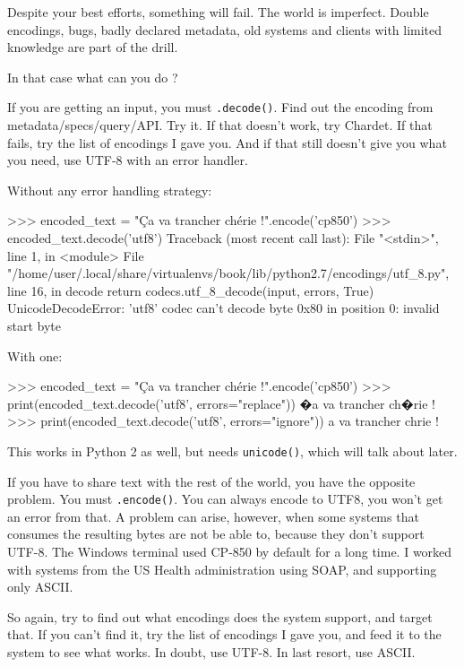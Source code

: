 Despite your best efforts, something will fail. The world is imperfect. Double encodings, bugs, badly declared metadata, old systems and clients with limited knowledge are part of the drill.

In that case what can you do ?

If you are getting an input, you must \lstinline{.decode()}. Find out the encoding from metadata/specs/query/API. Try it. If that doesn't work, try Chardet. If that fails, try the list of encodings I gave you. And if that still doesn't give you what you need, use UTF-8 with an error handler.

Without any error handling strategy:

\begin{py3}
>>> encoded_text = "Ça va trancher chérie !".encode('cp850')
>>> encoded_text.decode('utf8')
Traceback (most recent call last):
  File "<stdin>", line 1, in <module>
  File "/home/user/.local/share/virtualenvs/book/lib/python2.7/encodings/utf_8.py", line 16, in decode
    return codecs.utf_8_decode(input, errors, True)
UnicodeDecodeError: 'utf8' codec can't decode byte 0x80 in position 0: invalid start byte
\end{py3}

With one:

\begin{py3}
>>> encoded_text = "Ça va trancher chérie !".encode('cp850')
>>> print(encoded_text.decode('utf8', errors="replace"))
�a va trancher ch�rie !
>>> print(encoded_text.decode('utf8', errors="ignore"))
a va trancher chrie !
\end{py3}

This works in Python 2 as well, but needs \lstinline{unicode()}, which will talk about later.

If you have to share text with the rest of the world, you have the opposite problem. You must \lstinline{.encode()}. You can always encode to UTF8, you won't get an error from that. A problem can arise, however, when some systems that consumes the resulting bytes are not be able to, because they don't support UTF-8. The Windows terminal used CP-850 by default for a long time. I worked with systems from the US Health administration using SOAP, and supporting only ASCII.

So again, try to find out what encodings does the system support, and target that. If you can't find it, try the list of encodings I gave you, and feed it to the system to see what works. In doubt, use UTF-8. In last resort, use ASCII.

